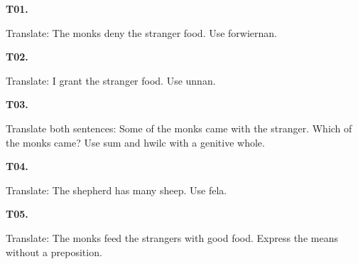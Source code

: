 \par\begin{minipage}{\linewidth}\raggedright
\textbf{T01.}

Translate: The monks deny the stranger food. Use forwiernan.

\end{minipage}\par\addvspace{4pt}

\par\begin{minipage}{\linewidth}\raggedright
\textbf{T02.}

Translate: I grant the stranger food. Use unnan.

\end{minipage}\par\addvspace{4pt}

\par\begin{minipage}{\linewidth}\raggedright
\textbf{T03.}

Translate both sentences: Some of the monks came with the stranger. Which of the monks came? Use sum and hwilc with a genitive whole.

\end{minipage}\par\addvspace{4pt}

\par\begin{minipage}{\linewidth}\raggedright
\textbf{T04.}

Translate: The shepherd has many sheep. Use fela.

\end{minipage}\par\addvspace{4pt}

\par\begin{minipage}{\linewidth}\raggedright
\textbf{T05.}

Translate: The monks feed the strangers with good food. Express the means without a preposition.

\end{minipage}\par\addvspace{4pt}

